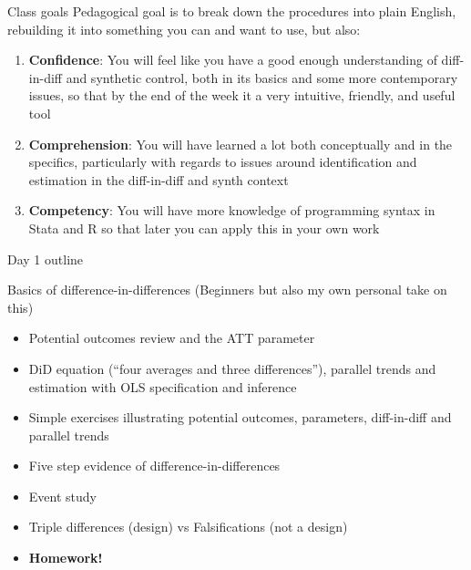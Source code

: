 \documentclass{beamer}
\begin{document}
\begin{frame}{Class goals}
Pedagogical goal is to break down the procedures into plain English, rebuilding it into something you can and want to use, but also:

  \begin{enumerate}
    \item \textbf{Confidence}: You will feel like you have a good enough understanding of diff-in-diff and synthetic control, both in its basics and some more contemporary issues, so that by the end of the week it a very intuitive, friendly, and useful tool
    \item \textbf{Comprehension}: You will have learned a lot both conceptually and in the specifics, particularly with regards to issues around identification and estimation in the diff-in-diff and synth context
    \item \textbf{Competency}: You will have more knowledge of programming syntax in Stata and R so that later you can apply this in your own work
  \end{enumerate}

\end{frame}



\begin{frame}{Day 1 outline}

Basics of difference-in-differences (Beginners but also my own personal take on this)
	\begin{itemize}
	\item Potential outcomes review and the ATT parameter
	\item DiD equation (``four averages and three differences''), parallel trends and estimation with OLS specification and inference
	\item Simple exercises illustrating potential outcomes, parameters, diff-in-diff and parallel trends
	\item Five step evidence of difference-in-differences
	\item Event study
	\item Triple differences (design) vs Falsifications (not a design)
	\item \textbf{Homework!}
	\end{itemize}

\end{frame}
\end{document}
